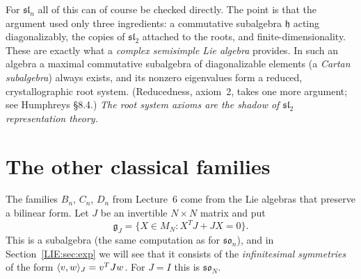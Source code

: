 For $\mathfrak{sl}_n$ all of this can of course be checked directly. The point is that the argument used
only three ingredients: a commutative subalgebra $\mathfrak h$ acting diagonalizably, the copies of
$\mathfrak{sl}_2$ attached to the roots, and finite-dimensionality. These are exactly what a
\emph{complex semisimple Lie algebra} provides. In such an algebra a maximal commutative subalgebra of
diagonalizable elements (a \emph{Cartan subalgebra}) always exists, and its nonzero eigenvalues form a
reduced, crystallographic root system. (Reducedness, axiom~2, takes one more argument; see Humphreys
\S8.4.) \emph{The root system axioms are the shadow of $\mathfrak{sl}_2$ representation theory.}

\section{The other classical families}
\label{LIE:sec:classical}

The families $B_n$, $C_n$, $D_n$ from Lecture~6 come from the Lie algebras that preserve a bilinear
form. Let $J$ be an invertible $N\times N$ matrix and put
\[
  \mathfrak g_J=\{X\in M_N: X^TJ+JX=0\}.
\]
This is a subalgebra (the same computation as for $\mathfrak{so}_n$), and in Section~\ref{LIE:sec:exp}
we will see that it consists of the \emph{infinitesimal symmetries} of the form $\langle v, w\rangle_J=v^TJw$.
For $J=I$ this is $\mathfrak{so}_N$.

